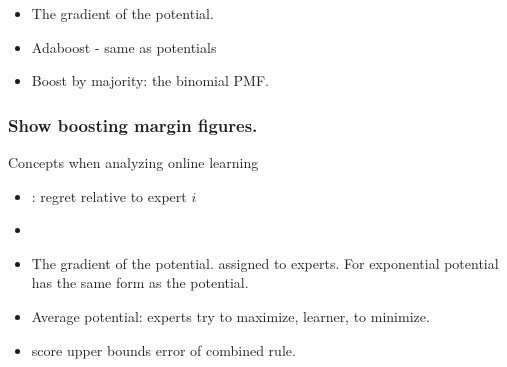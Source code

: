 \documentclass{beamer}
\begin{document}
\begin{frame}
  \begin{itemize}
   \item {} The gradient of the potential.
   \item Adaboost - same as potentials
     \item Boost by majority: the binomial PMF.
  \end{itemize}
\end{frame}
\begin{frame}
  \frametitle{Show boosting margin figures.}
  
\end{frame}


\begin{frame}{Concepts when analyzing online learning}
  \begin{itemize}
   \item {} : regret relative to expert $i$
   \item {}
  \item {} The gradient of the potential. assigned to experts. For exponential potential has the same form as the potential.
  \item {} Average potential:  experts try to maximize, learner, to minimize.
  \item score upper bounds error of combined rule.
  \end{itemize}
\end{frame}

  
\end{document}
